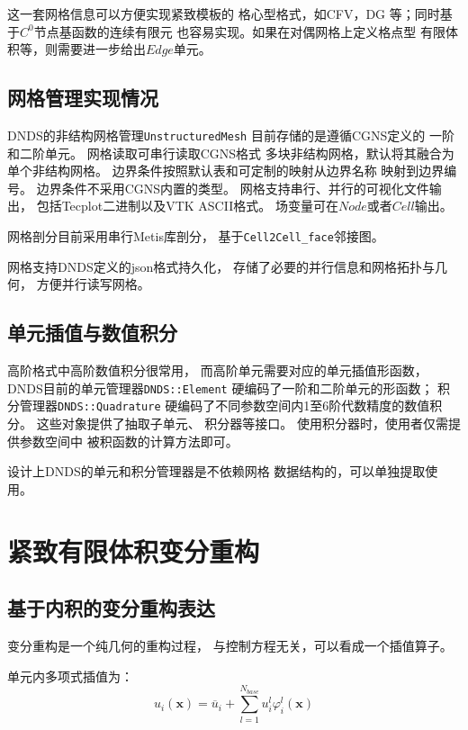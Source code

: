 \documentclass[UTF8,zihao=5]{ctexart} %
\newcommand*{\mean}[1]{{#1}}
\begin{document}
这一套网格信息可以方便实现紧致模板的
格心型格式，如CFV，DG
等；同时基于$C^0$节点基函数的连续有限元
也容易实现。如果在对偶网格上定义格点型
有限体积等，则需要进一步给出$Edge$单元。

\subsection{网格管理实现情况}

DNDS的非结构网格管理\verb|UnstructuredMesh|
目前存储的是遵循CGNS定义的
一阶和二阶单元。
网格读取可串行读取CGNS格式
多块非结构网格，默认将其融合为单个非结构网格。
边界条件按照默认表和可定制的映射从边界名称
映射到边界编号。
边界条件不采用CGNS内置的类型。
网格支持串行、并行的可视化文件输出，
包括Tecplot二进制以及VTK ASCII格式。
场变量可在$Node$或者$Cell$输出。

网格剖分目前采用串行Metis库剖分，
基于\verb|Cell2Cell_face|邻接图。

网格支持DNDS定义的json格式持久化，
存储了必要的并行信息和网格拓扑与几何，
方便并行读写网格。

\subsection{单元插值与数值积分}

高阶格式中高阶数值积分很常用，
而高阶单元需要对应的单元插值形函数，
DNDS目前的单元管理器\verb|DNDS::Element|
硬编码了一阶和二阶单元的形函数；
积分管理器\verb|DNDS::Quadrature|
硬编码了不同参数空间内1至6阶代数精度的数值积分。
这些对象提供了抽取子单元、
积分器等接口。
使用积分器时，使用者仅需提供参数空间中
被积函数的计算方法即可。

设计上DNDS的单元和积分管理器是不依赖网格
数据结构的，可以单独提取使用。


\section{紧致有限体积变分重构}


\subsection{基于内积的变分重构表达}
\renewcommand*{\mean}[1]
{\overline{#1}}
\newcommand*{\x}[0]
{\symbf{x}}
\newcommand*{\D}[0]
{\mathcal{D}}
\newcommand*{\inner}[1]
{\left\langle#1\right\rangle}

变分重构是一个纯几何的重构过程，
与控制方程无关，可以看成一个插值算子。

单元内多项式插值为：
\begin{equation}
    \label{eq:base2rec}
    u_i(\x)=\mean{u}_i + \sum_{l=1}^{N_{base}}{u_i^l\varphi_i^l(\x)}
\end{equation}
\end{document}
